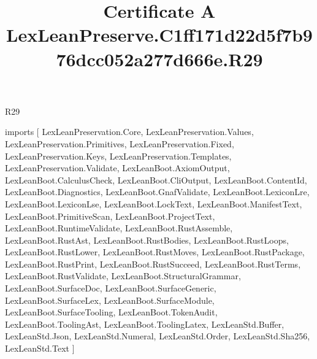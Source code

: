 \begin{lexlean}{R29}
\title{Certificate A LexLeanPreserve.C1ff171d22d5f7b976dcc052a277d666e.R29}
\begin{coremodule}
imports [
  LexLeanPreservation.Core,
  LexLeanPreservation.Values,
  LexLeanPreservation.Primitives,
  LexLeanPreservation.Fixed,
  LexLeanPreservation.Keys,
  LexLeanPreservation.Templates,
  LexLeanPreservation.Validate,
  LexLeanBoot.AxiomOutput,
  LexLeanBoot.CalculusCheck,
  LexLeanBoot.CliOutput,
  LexLeanBoot.ContentId,
  LexLeanBoot.Diagnostics,
  LexLeanBoot.GnafValidate,
  LexLeanBoot.LexiconLre,
  LexLeanBoot.LexiconLse,
  LexLeanBoot.LockText,
  LexLeanBoot.ManifestText,
  LexLeanBoot.PrimitiveScan,
  LexLeanBoot.ProjectText,
  LexLeanBoot.RuntimeValidate,
  LexLeanBoot.RustAssemble,
  LexLeanBoot.RustAst,
  LexLeanBoot.RustBodies,
  LexLeanBoot.RustLoops,
  LexLeanBoot.RustLower,
  LexLeanBoot.RustMoves,
  LexLeanBoot.RustPackage,
  LexLeanBoot.RustPrint,
  LexLeanBoot.RustSucceed,
  LexLeanBoot.RustTerms,
  LexLeanBoot.RustValidate,
  LexLeanBoot.StructuralGrammar,
  LexLeanBoot.SurfaceDoc,
  LexLeanBoot.SurfaceGeneric,
  LexLeanBoot.SurfaceLex,
  LexLeanBoot.SurfaceModule,
  LexLeanBoot.SurfaceTooling,
  LexLeanBoot.TokenAudit,
  LexLeanBoot.ToolingAst,
  LexLeanBoot.ToolingLatex,
  LexLeanStd.Buffer,
  LexLeanStd.Json,
  LexLeanStd.Numeral,
  LexLeanStd.Order,
  LexLeanStd.Sha256,
  LexLeanStd.Text
]


\end{coremodule}
\end{lexlean}
